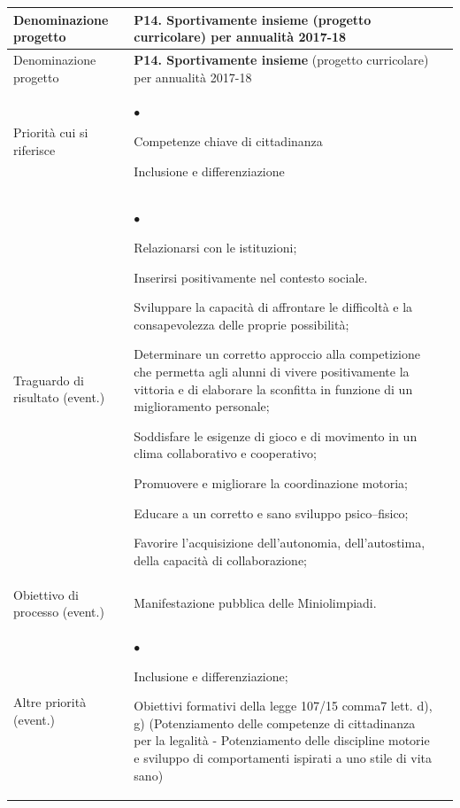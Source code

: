 \documentclass[12pt,a4paper,oneside]{memoir}
\newenvironment{elenco}{\begin{list}{$\bullet$}{%
              \setlength{\leftmargin}{4mm}%
              \setlength{\rightmargin}{1mm}%
               \setlength{\itemindent}{0mm}%
               \setlength{\labelwidth}{2mm}%
               \setlength{\labelsep}{2mm}%
              \setlength{\itemsep}{-\parsep}%
              \setlength{\partopsep}{0pt}%
              \setlength{\topsep}{0pt}%
             \setlength{\parskip}{0pt}%
              }}{\end{list}}
\begin{document}
\begin{footnotesize}
\begin{longtable}{|>{\raggedright}p{2.5cm}|>{\raggedright\arraybackslash}P{10cm}|}
\hline
{}
\label{P14}Denominazione progetto&\textbf{P14. Sportivamente insieme} (progetto curricolare) per annualità 2017-18 \\ \hline \endfirsthead
\hline
{}
Denominazione progetto&\textbf{P14. Sportivamente insieme} (progetto curricolare) per annualità 2017-18 \\ \hline \endhead
{}
\endfoot
\hline
\endlastfoot
Priorità cui si riferisce&
\begin{elenco}
\item Competenze chiave di cittadinanza 
\item Inclusione e differenziazione
\end{elenco}\\[-4mm] \hline
Traguardo di risultato (event.)&
\begin{elenco}
\item Relazionarsi con le  istituzioni;
\item Inserirsi positivamente nel contesto sociale.
\item Sviluppare la capacità di affrontare le difficoltà e la consapevolezza delle proprie possibilità;
\item Determinare un corretto approccio alla competizione che permetta agli alunni di vivere positivamente la vittoria e di elaborare la sconfitta in funzione di un miglioramento personale;
\item Soddisfare le esigenze di gioco e di movimento in un clima collaborativo e cooperativo;
\item Promuovere e migliorare la coordinazione motoria;
\item Educare a un corretto e sano sviluppo psico–fisico;
\item Favorire l'acquisizione dell'autonomia, dell'autostima, della capacità di collaborazione;
\end{elenco}\\[-4mm] \hline
Obiettivo di processo (event.)&Manifestazione pubblica delle Miniolimpiadi.\\ \hline
Altre priorità (event.)&
\begin{elenco}
\item Inclusione e differenziazione;
\item Obiettivi formativi della legge 107/15 comma7 lett. d), g)  (Potenziamento delle competenze di cittadinanza  per la legalità - Potenziamento delle discipline motorie e sviluppo di comportamenti ispirati a uno stile di vita sano)

\end{elenco}
\end{longtable}
\end{footnotesize}
\end{document}

